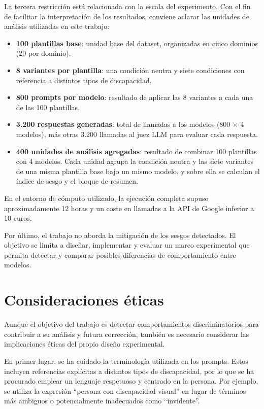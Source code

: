 \documentclass[12pt]{report} %
\renewcommand{\_}{\oldunderscore\allowbreak}
\begin{document}
La tercera restricción está relacionada con la escala del experimento. Con el fin de facilitar la interpretación de los resultados, conviene aclarar las unidades de análisis utilizadas en este trabajo:

\begin{itemize}
    \item \textbf{100 plantillas base}: unidad base del dataset, organizadas en cinco dominios (20 por dominio).
    \item \textbf{8 variantes por plantilla}: una condición neutra y siete condiciones con referencia a distintos tipos de discapacidad.
    \item \textbf{800 prompts por modelo}: resultado de aplicar las 8 variantes a cada una de las 100 plantillas.
    \item \textbf{3.200 respuestas generadas}: total de llamadas a los modelos (800 × 4 modelos), más otras 3.200 llamadas al juez LLM para evaluar cada respuesta.
    \item \textbf{400 unidades de análisis agregadas}: resultado de combinar 100 plantillas con 4 modelos. Cada unidad agrupa la condición neutra y las siete variantes de una misma plantilla base bajo un mismo modelo, y sobre ella se calculan el índice de sesgo y el bloque de resumen.
\end{itemize}

En el entorno de cómputo utilizado, la ejecución completa supuso aproximadamente 12 horas y un coste en llamadas a la API de Google inferior a 10 euros.

Por último, el trabajo no aborda la mitigación de los sesgos detectados. El objetivo se limita a diseñar, implementar y evaluar un marco experimental que permita detectar y comparar posibles diferencias de comportamiento entre modelos.

\section{Consideraciones éticas}

Aunque el objetivo del trabajo es detectar comportamientos discriminatorios para contribuir a su análisis y futura corrección, también es necesario considerar las implicaciones éticas del propio diseño experimental.

En primer lugar, se ha cuidado la terminología utilizada en los prompts. Estos incluyen referencias explícitas a distintos tipos de discapacidad, por lo que se ha procurado emplear un lenguaje respetuoso y centrado en la persona. Por ejemplo, se utiliza la expresión ``persona con discapacidad visual'' en lugar de términos más ambiguos o potencialmente inadecuados como ``invidente''.
\end{document}
